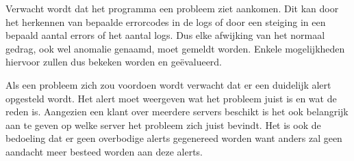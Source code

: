 Verwacht wordt dat het programma een probleem ziet aankomen. Dit kan door het herkennen van bepaalde errorcodes in de logs of door een steiging in een bepaald aantal errors of het aantal logs. Dus elke afwijking van het normaal gedrag, ook wel anomalie genaamd, moet gemeldt worden. Enkele mogelijkheden hiervoor zullen dus bekeken worden en geëvalueerd.

Als een probleem zich zou voordoen wordt verwacht dat er een duidelijk alert opgesteld wordt. Het alert moet weergeven wat het probleem juist is en wat de reden is. Aangezien een klant over meerdere servers beschikt is het ook belangrijk aan te geven op welke server het probleem zich juist bevindt. Het is ook de bedoeling dat er geen overbodige alerts gegenereed worden want anders zal geen aandacht meer besteed worden aan deze alerts.
